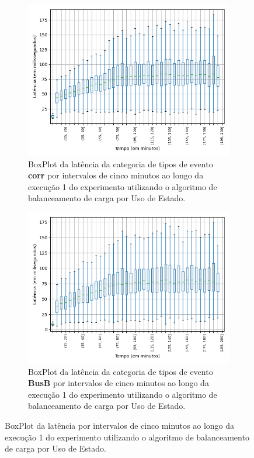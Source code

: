 \begin{figure}
\begin{subfigure}{.5\textwidth}
\centering
\includegraphics[width=\textwidth]{figuras/graphics/boxplot_5-dez-su_corr.png}
\caption{BoxPlot da latência da categoria de tipos de evento \textbf{corr} por intervalos de cinco minutos ao longo da execução 1 do experimento utilizando o algoritmo de balanceamento de carga por Uso de Estado.}
\label{fig:BoxPlot_corr_SU_1}
\end{subfigure}%
\begin{subfigure}{.5\textwidth}
\centering
\includegraphics[width=\textwidth]{figuras/graphics/boxplot_5-dez-su_busb.png}
\caption{BoxPlot da latência da categoria de tipos de evento \textbf{BusB} por intervalos de cinco minutos ao longo da execução 1 do experimento utilizando o algoritmo de balanceamento de carga por Uso de Estado.}
\label{fig:BoxPlot_BusB_SU_1}
\end{subfigure}%
\caption{BoxPlot da latência por intervalos de cinco minutos ao longo da execução 1 do experimento utilizando o algoritmo de balanceamento de carga por Uso de Estado.}
\end{figure}






